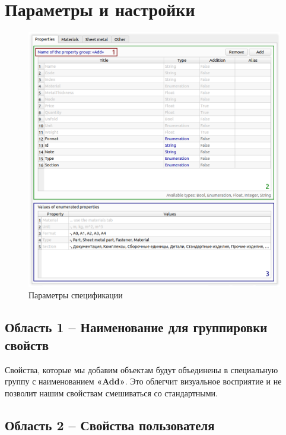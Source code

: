 \documentclass[a4paper,12pt]{article}
\begin{document}
\pagebreak




\section{Параметры и настройки}

\begin{figure}[htp]
	\centering
	\includegraphics[width=1\textwidth]{img/pref_specification.png}
	\caption{Параметры спецификации}
	\label{sec:pref_specification}
\end{figure}

\subsection{Область 1 -- Наименование для группировки свойств}
Свойства, которые мы добавим объектам будут объединены в специальную группу с наименованием \textbf{«Add»}. Это облегчит визуальное восприятие и не позволит нашим свойствам смешиваться со стандартными.

\pagebreak


\subsection{Область 2 -- Свойства пользователя}
\end{document}
